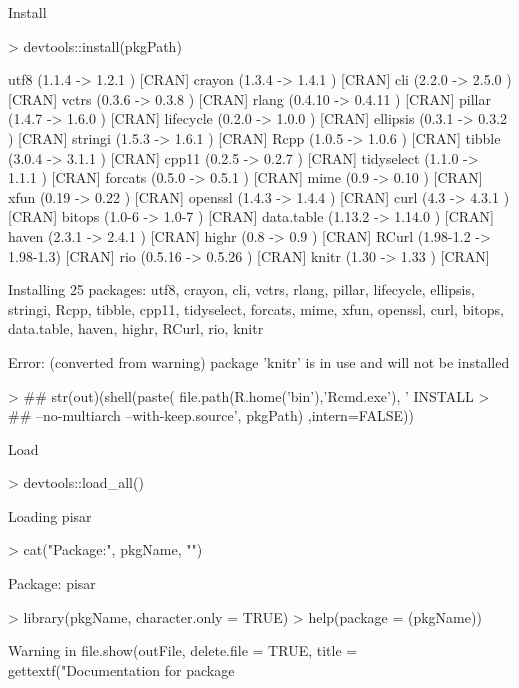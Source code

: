 \documentclass[a4paper,12pt]{article}\usepackage[]{graphicx}\usepackage[]{color}
\begin{document}
Install

\begin{Schunk}
\begin{Sinput}
> devtools::install(pkgPath)
\end{Sinput}
\begin{Soutput}
utf8       (1.1.4    -> 1.2.1   ) [CRAN]
crayon     (1.3.4    -> 1.4.1   ) [CRAN]
cli        (2.2.0    -> 2.5.0   ) [CRAN]
vctrs      (0.3.6    -> 0.3.8   ) [CRAN]
rlang      (0.4.10   -> 0.4.11  ) [CRAN]
pillar     (1.4.7    -> 1.6.0   ) [CRAN]
lifecycle  (0.2.0    -> 1.0.0   ) [CRAN]
ellipsis   (0.3.1    -> 0.3.2   ) [CRAN]
stringi    (1.5.3    -> 1.6.1   ) [CRAN]
Rcpp       (1.0.5    -> 1.0.6   ) [CRAN]
tibble     (3.0.4    -> 3.1.1   ) [CRAN]
cpp11      (0.2.5    -> 0.2.7   ) [CRAN]
tidyselect (1.1.0    -> 1.1.1   ) [CRAN]
forcats    (0.5.0    -> 0.5.1   ) [CRAN]
mime       (0.9      -> 0.10    ) [CRAN]
xfun       (0.19     -> 0.22    ) [CRAN]
openssl    (1.4.3    -> 1.4.4   ) [CRAN]
curl       (4.3      -> 4.3.1   ) [CRAN]
bitops     (1.0-6    -> 1.0-7   ) [CRAN]
data.table (1.13.2   -> 1.14.0  ) [CRAN]
haven      (2.3.1    -> 2.4.1   ) [CRAN]
highr      (0.8      -> 0.9     ) [CRAN]
RCurl      (1.98-1.2 -> 1.98-1.3) [CRAN]
rio        (0.5.16   -> 0.5.26  ) [CRAN]
knitr      (1.30     -> 1.33    ) [CRAN]
\end{Soutput}
\begin{Soutput}
Installing 25 packages: utf8, crayon, cli, vctrs, rlang, pillar, lifecycle, ellipsis, stringi, Rcpp, tibble, cpp11, tidyselect, forcats, mime, xfun, openssl, curl, bitops, data.table, haven, highr, RCurl, rio, knitr
\end{Soutput}
\begin{Soutput}
Error: (converted from warning) package 'knitr' is in use and will not be installed
\end{Soutput}
\begin{Sinput}
> ## str(out)(shell(paste( file.path(R.home('bin'),'Rcmd.exe'), ' INSTALL
> ## --no-multiarch --with-keep.source', pkgPath) ,intern=FALSE))
\end{Sinput}
\end{Schunk}

Load
\begin{Schunk}
\begin{Sinput}
> devtools::load_all()
\end{Sinput}
\begin{Soutput}
Loading pisar
\end{Soutput}
\begin{Sinput}
> cat("Package:", pkgName, "\n")
\end{Sinput}
\begin{Soutput}
Package: pisar 
\end{Soutput}
\begin{Sinput}
> library(pkgName, character.only = TRUE)
> help(package = (pkgName))
\end{Sinput}
\begin{Soutput}
Warning in file.show(outFile, delete.file = TRUE, title = gettextf("Documentation for package %s", : '"C:\Program Files (x86)\EmEditor\EmEditor.exe"' not found
\end{Soutput}
\end{Schunk}
\end{document}
